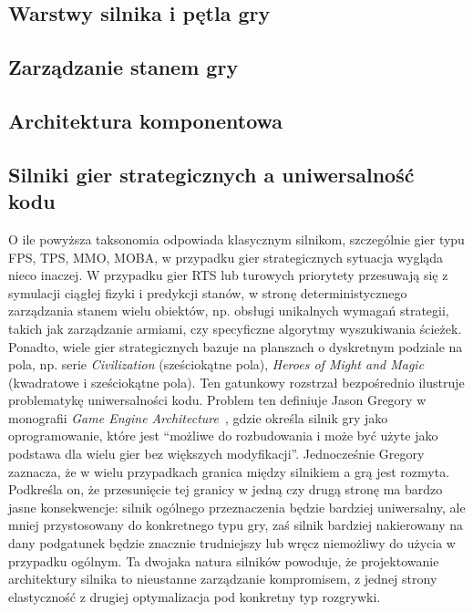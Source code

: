\documentclass[
    bindingoffset=5mm,
    footnoteindent=3mm,
    hyphenation=true
]{src/wut-thesis}
\begin{document}
\subsection{Warstwy silnika i pętla gry}

\subsection{Zarządzanie stanem gry}

\subsection{Architektura komponentowa}

\subsection{Silniki gier strategicznych a uniwersalność kodu}

O ile powyższa taksonomia odpowiada klasycznym silnikom, szczególnie gier typu
FPS, TPS, MMO, MOBA, w przypadku gier strategicznych sytuacja wygląda nieco
inaczej. W przypadku gier RTS lub turowych priorytety przesuwają się z symulacji
ciągłej fizyki i predykcji stanów, w stronę deterministycznego zarządzania stanem wielu
obiektów, np. obsługi unikalnych wymagań strategii, takich jak zarządzanie armiami,
czy specyficzne algorytmy wyszukiwania ścieżek. Ponadto, wiele gier strategicznych
bazuje na planszach o dyskretnym podziale na pola, np. serie \emph{Civilization}
(sześciokątne pola), \emph{Heroes of Might and Magic} (kwadratowe i sześciokątne pola). Ten
gatunkowy rozstrzał bezpośrednio ilustruje problematykę uniwersalności kodu.
Problem ten definiuje Jason Gregory w monografii \emph{Game Engine Architecture}~\cite{GEA},
gdzie określa silnik gry jako oprogramowanie, które jest “możliwe do rozbudowania i
może być użyte jako podstawa dla wielu gier bez większych modyfikacji”.
Jednocześnie Gregory zaznacza, że w wielu przypadkach granica między silnikiem a
grą jest rozmyta. Podkreśla on, że przesunięcie tej granicy w jedną czy drugą stronę
ma bardzo jasne konsekwencje: silnik ogólnego przeznaczenia będzie bardziej
uniwersalny, ale mniej przystosowany do konkretnego typu gry, zaś silnik bardziej
nakierowany na dany podgatunek będzie znacznie trudniejszy lub wręcz niemożliwy do
użycia w przypadku ogólnym. Ta dwojaka natura silników powoduje, że projektowanie
architektury silnika to nieustanne zarządzanie kompromisem, z jednej strony
elastyczność z drugiej optymalizacja pod konkretny typ rozgrywki.
\end{document}
